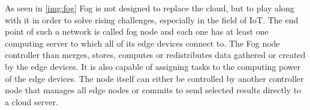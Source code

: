 \cite[p. 862]{DBLP:journals/iotj/ChiangZ16}

As seen in \autoref{img:fog} Fog is not designed to replace the cloud, but to play along with it in order to solve rising challenges, especially in the field of IoT. The end point of such a network is called fog node and each one has at least one computing server to which all of its edge devices connect to. The Fog node controller than merges, stores, computes or redistributes data gathered or created by the edge devices. It is also capable of assigning tasks to the computing power of the edge devices. The node itself can either be controlled by another controller node that manages all edge nodes or commits to send selected results directly to a cloud server.

